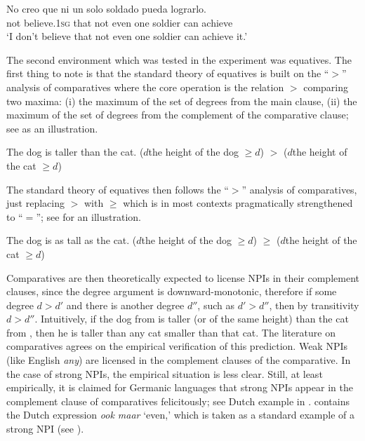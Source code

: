 \documentclass[output=paper,colorlinks,citecolor=brown]{langscibook}
\begin{document}
\ea\label{ex-span-1}\gll No creo que ni un solo soldado pueda lograrlo.\\
not believe.\textsc{1sg} that not even one soldier can achieve\\
\glt `I don't believe that not even one soldier can achieve it.'
\z

\noindent The second environment which was tested in the experiment was equatives. The first thing to note is that the standard theory of equatives is built on the ``$>$'' analysis of comparatives \citep{beck_comparison_nodate,stechow1984comparing} where the core operation is the relation $>$ comparing two maxima: (i) the maximum of the set of degrees from the main clause, (ii) the maximum of the set of degrees from the complement of the comparative clause; see  as an illustration. 


\ea\label{ex-17} The dog is taller than the cat. \ea {}({$d$\vert the height of the dog $\geq d$}) $>$ ({$d$\vert the height of the cat $\geq d$})\z\z

\noindent The standard theory of equatives \citep{beck_comparison_nodate,stechow1984comparing,rullmann1995maximality} then follows the ``$>$'' analysis of comparatives, just replacing $>$ with $\geq$ which is in most contexts pragmatically strengthened to ``$=$''; see  for an illustration. 

\ea\label{ex-18} The dog is as tall as the cat. \ea {}({$d$\vert the height of the dog $\geq d$}) $\geq$ ({$d$\vert the height of the cat $\geq d$})\z\z

\noindent Comparatives are then theoretically expected to license NPIs in their complement clauses, since the degree argument is downward-monotonic, therefore if some degree $d > d'$ and there is another degree $d''$, such as $d' > d''$, then by transitivity $d > d''$. Intuitively, if the dog from  is taller (or of the same height) than the cat from , then he is taller than any cat smaller than that cat. The literature on comparatives  \citep{stechow1984comparing,rullmann1995maximality,gajewski2008more} agrees on the empirical verification of this prediction. Weak NPIs (like English \textit{any}) are licensed in the complement clauses of the comparative. In the case of strong NPIs, the empirical situation is less clear. Still, at least empirically, it is claimed for Germanic languages that strong NPIs appear in the complement clause of comparatives felicitously; see  Dutch example in .  contains the Dutch expression \textit{ook maar} `even,' which is taken as a standard example of a strong NPI (see \citealt{zwarts1998three}).
\end{document}
